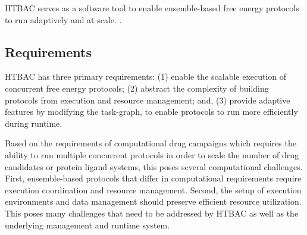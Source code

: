 HTBAC serves as a software tool to enable ensemble-based free energy protocols
to run adaptively and at scale. .




\subsection{Requirements}

HTBAC has three primary requirements: (1) enable the scalable execution of
concurrent free energy protocols; (2) abstract the complexity of building
protocols
from execution and resource management; and, (3) provide
adaptive features by modifying the task-graph, to enable protocols to run more 
efficiently during runtime.  


Based on the requirements of computational drug campaigns  
which requires the ability to run multiple concurrent protocols in order to 
scale the number of drug candidates or protein ligand systems, this poses 
several computational challenges. First, ensemble-based protocols that differ in 
computational requirements require execution coordination and resource 
management. Second, the setup of execution environments and data 
management should preserve efficient resource utilization. This poses many 
challenges that need to be addressed by HTBAC as well as the underlying 
management and runtime system. 

